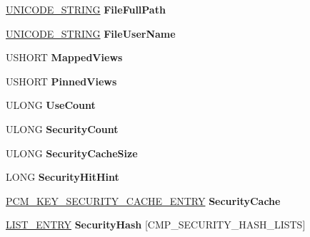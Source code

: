\begin{DoxyCompactItemize}
\hyperlink{struct___u_n_i_c_o_d_e___s_t_r_i_n_g}{U\+N\+I\+C\+O\+D\+E\+\_\+\+S\+T\+R\+I\+NG} {\bfseries File\+Full\+Path}
\item 
\mbox{\label{struct___c_m_h_i_v_e_ac22168a9e7e26358c9bf3760be7c2913}} 
\hyperlink{struct___u_n_i_c_o_d_e___s_t_r_i_n_g}{U\+N\+I\+C\+O\+D\+E\+\_\+\+S\+T\+R\+I\+NG} {\bfseries File\+User\+Name}
\item 
\mbox{\label{struct___c_m_h_i_v_e_a43952a14d253957afcc36a451d2024f6}} 
U\+S\+H\+O\+RT {\bfseries Mapped\+Views}
\item 
\mbox{\label{struct___c_m_h_i_v_e_aef706e8f69b0c70cc817ea8e9252dad4}} 
U\+S\+H\+O\+RT {\bfseries Pinned\+Views}
\item 
\mbox{\label{struct___c_m_h_i_v_e_a65095dd46fe5116d69469f0d6a46b2e9}} 
U\+L\+O\+NG {\bfseries Use\+Count}
\item 
\mbox{\label{struct___c_m_h_i_v_e_a324cf0f2bace1586469d938fcdebae1a}} 
U\+L\+O\+NG {\bfseries Security\+Count}
\item 
\mbox{\label{struct___c_m_h_i_v_e_ac50a7bdf3383b3f8a14079f9e198c483}} 
U\+L\+O\+NG {\bfseries Security\+Cache\+Size}
\item 
\mbox{\label{struct___c_m_h_i_v_e_a00b43696e949784098d56810fe1659ca}} 
L\+O\+NG {\bfseries Security\+Hit\+Hint}
\item 
\mbox{\label{struct___c_m_h_i_v_e_ad01681b7da3ffc9ff9d08af8445c515c}} 
\hyperlink{struct___c_m___k_e_y___s_e_c_u_r_i_t_y___c_a_c_h_e___e_n_t_r_y}{P\+C\+M\+\_\+\+K\+E\+Y\+\_\+\+S\+E\+C\+U\+R\+I\+T\+Y\+\_\+\+C\+A\+C\+H\+E\+\_\+\+E\+N\+T\+RY} {\bfseries Security\+Cache}
\item 
\mbox{\label{struct___c_m_h_i_v_e_a85ce5577f92d51dcdf1805626c206c94}} 
\hyperlink{struct___l_i_s_t___e_n_t_r_y}{L\+I\+S\+T\+\_\+\+E\+N\+T\+RY} {\bfseries Security\+Hash} \mbox{[}C\+M\+P\+\_\+\+S\+E\+C\+U\+R\+I\+T\+Y\+\_\+\+H\+A\+S\+H\+\_\+\+L\+I\+S\+TS\mbox{]}
\item 
\mbox{\label{struct___c_m_h_i_v_e_ac0bb64c527bfbed113b0440fa9b95bf9}} 

\end{DoxyCompactItemize}
